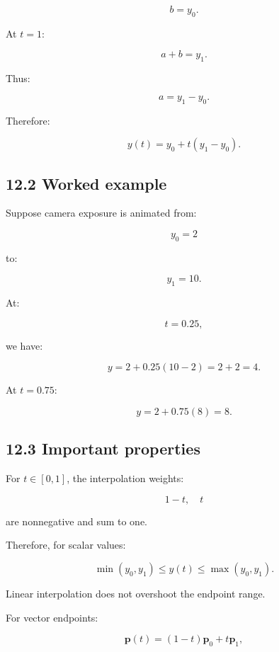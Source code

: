 \[ b=y_0. \]

At \(t=1\):

\[ a+b=y_1. \]

Thus:

\[ a=y_1-y_0. \]

Therefore:

\[ y(t)=y_0+t(y_1-y_0). \]

\begin{allmightroleexample}

\subsection{12.2 Worked example}\label{02-foundations-ii-ch028-worked-example-1}

\hypertarget{02-foundations-ii-ch028-worked-example-1}{}

Suppose camera exposure is animated from:

\end{allmightroleexample}

\[ y_0=2 \]

to:

\[ y_1=10. \]

At:

\[ t=0.25, \]

we have:

\[ y=2+0.25(10-2) =2+2 =\boxed4. \]

At \(t=0.75\):

\[ y=2+0.75(8)=8. \]

\subsection{12.3 Important properties}\label{02-foundations-ii-ch028-important-properties}

\hypertarget{02-foundations-ii-ch028-important-properties}{}

For \(t\in[0,1]\), the interpolation weights:

\[ 1-t,\quad t \]

are nonnegative and sum to one.

Therefore, for scalar values:

\[ \boxed{ \min(y_0,y_1)\le y(t)\le\max(y_0,y_1) }. \]

Linear interpolation does not overshoot the endpoint range.

For vector endpoints:

\[ \mathbf p(t)=(1-t)\mathbf p_0+t\mathbf p_1, \]

